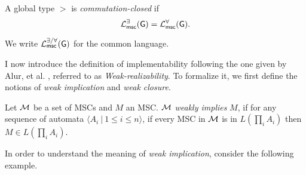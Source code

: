 \bigskip

\begin{definition}
    A global type $\gt$ is \emph{commutation-closed} if
    $$
    \mathcal{L}_{\mathsf{msc}}^{\exists}(\mathsf{G}) = \mathcal{L}_{\mathsf{msc}}^{\forall}(\mathsf{G}).
    $$
\end{definition}
We write $\mathcal{L}_{\mathsf{msc}}^{\exists/\forall}(\mathsf{G})$ for the common language.

I now introduce the definition of implementability following the one given 
by Alur, et al. \cite{alur2005realizability}, referred to as 
\textit{Weak-realizability}.
To formalize it, we first define the notions of 
\textit{weak implication} and \textit{weak closure}.


\bigskip

\begin{definition}
	Let $\mathcal{M}$ be a set of MSCs and $M$ an MSC. $\mathcal{M}$
	\textit{weakly implies} $M$, if for any sequence of automata
	$\langle A_i \ |\ 1\leq i\leq n\rangle$, if every MSC in $\mathcal{M}$ is in
	$L(\prod_i A_i)$ then $M \in L(\prod_i A_i)$.
\end{definition}

In order to understand the meaning of \emph{weak implication},
consider the following example.

\bigskip

